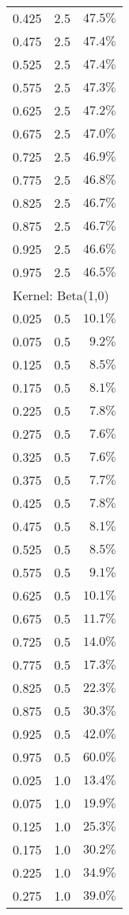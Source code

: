 \begin{longtable}{rrr}
0.425 & 2.5 & $47.5\%$ \\ 
0.475 & 2.5 & $47.4\%$ \\ 
0.525 & 2.5 & $47.4\%$ \\ 
0.575 & 2.5 & $47.3\%$ \\ 
0.625 & 2.5 & $47.2\%$ \\ 
0.675 & 2.5 & $47.0\%$ \\ 
0.725 & 2.5 & $46.9\%$ \\ 
0.775 & 2.5 & $46.8\%$ \\ 
0.825 & 2.5 & $46.7\%$ \\ 
0.875 & 2.5 & $46.7\%$ \\ 
0.925 & 2.5 & $46.6\%$ \\ 
0.975 & 2.5 & $46.5\%$ \\ 
\midrule
\multicolumn{3}{l}{Kernel: Beta(1,0)} \\ 
\midrule
0.025 & 0.5 & $10.1\%$ \\ 
0.075 & 0.5 & $9.2\%$ \\ 
0.125 & 0.5 & $8.5\%$ \\ 
0.175 & 0.5 & $8.1\%$ \\ 
0.225 & 0.5 & $7.8\%$ \\ 
0.275 & 0.5 & $7.6\%$ \\ 
0.325 & 0.5 & $7.6\%$ \\ 
0.375 & 0.5 & $7.7\%$ \\ 
0.425 & 0.5 & $7.8\%$ \\ 
0.475 & 0.5 & $8.1\%$ \\ 
0.525 & 0.5 & $8.5\%$ \\ 
0.575 & 0.5 & $9.1\%$ \\ 
0.625 & 0.5 & $10.1\%$ \\ 
0.675 & 0.5 & $11.7\%$ \\ 
0.725 & 0.5 & $14.0\%$ \\ 
0.775 & 0.5 & $17.3\%$ \\ 
0.825 & 0.5 & $22.3\%$ \\ 
0.875 & 0.5 & $30.3\%$ \\ 
0.925 & 0.5 & $42.0\%$ \\ 
0.975 & 0.5 & $60.0\%$ \\ 
0.025 & 1.0 & $13.4\%$ \\ 
0.075 & 1.0 & $19.9\%$ \\ 
0.125 & 1.0 & $25.3\%$ \\ 
0.175 & 1.0 & $30.2\%$ \\ 
0.225 & 1.0 & $34.9\%$ \\ 
0.275 & 1.0 & $39.0\%$ \\ 

\end{longtable}
